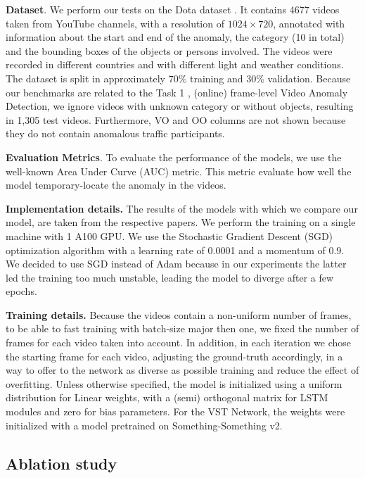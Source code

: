 \noindent\textbf{Dataset}.
We perform our tests on the Dota dataset \cite{9712446}.
It contains 4677 videos taken from YouTube channels, with a resolution of $1024 \times 720$, annotated with information about the start and end of the anomaly, the category (10 in total) and the bounding boxes of the objects or persons involved.
The videos were recorded in different countries and with different light and weather conditions.
The dataset is split in approximately $70\%$ training and $30\%$ validation.
Because our benchmarks are related to the Task 1 \cite{9712446}, (online) frame-level Video Anomaly Detection, we ignore videos with unknown category or without objects, resulting in 1,305 test videos.
Furthermore, VO and OO columns are not shown because they do not contain anomalous traffic participants.

\noindent\textbf{Evaluation Metrics}.
To evaluate the performance of the models, we use the well-known Area Under Curve (AUC) metric.
This metric evaluate how well the model temporary-locate the anomaly in the videos.

\noindent\textbf{Implementation details.}
The results of the models with which we compare our model, are taken from the respective papers.
We perform the training on a single machine with 1 A100 GPU.
We use the Stochastic Gradient Descent (SGD) optimization algorithm with a learning rate of 0.0001 and a momentum of 0.9.
We decided to use SGD instead of Adam because in our experiments the latter led the training too much unstable, leading the model to diverge after a few epochs.

\noindent\textbf{Training details.}
Because the videos contain a non-uniform number of frames, to be able to fast training with batch-size major then one, we fixed the number of frames for each video taken into account.
In addition, in each iteration we chose the starting frame for each video, adjusting the ground-truth accordingly, in a way to offer to the network as diverse as possible training and reduce the effect of overfitting.
Unless otherwise specified, the model is initialized using a uniform distribution for Linear weights, with a (semi) orthogonal matrix for LSTM modules and zero for bias parameters.
For the VST Network, the weights were initialized with a model pretrained on Something-Something v2.

\subsection{Ablation study}

